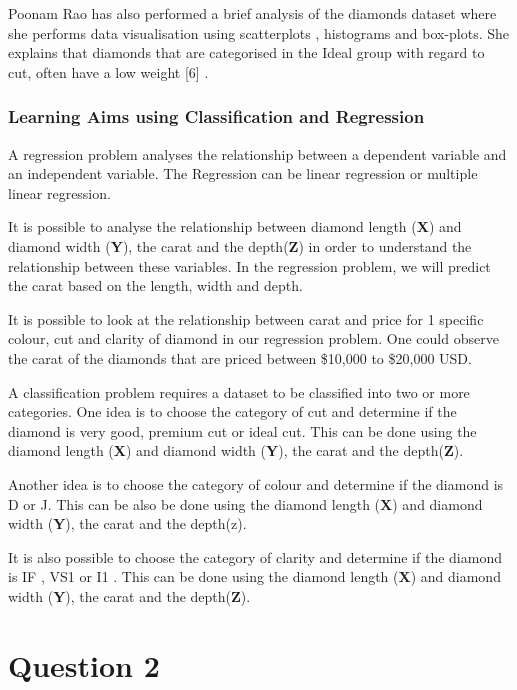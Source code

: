 \documentclass[
]{article}
\begin{document}
Poonam Rao has also performed a brief analysis of the diamonds dataset
where she performs data visualisation using scatterplots , histograms
and box-plots. She explains that diamonds that are categorised in the
Ideal group with regard to cut, often have a low weight {[}6{]} .

\subsubsection{Learning Aims using Classification and
Regression}\label{learning-aims-using-classification-and-regression}

A regression problem analyses the relationship between a dependent
variable and an independent variable. The Regression can be linear
regression or multiple linear regression.

It is possible to analyse the relationship between diamond length
(\textbf{X}) and diamond width (\textbf{Y}), the carat and the
depth(\textbf{Z}) in order to understand the relationship between these
variables. In the regression problem, we will predict the carat based on
the length, width and depth.

It is possible to look at the relationship between carat and price for 1
specific colour, cut and clarity of diamond in our regression problem.
One could observe the carat of the diamonds that are priced between
\$10,000 to \$20,000 USD.

A classification problem requires a dataset to be classified into two or
more categories. One idea is to choose the category of cut and determine
if the diamond is very good, premium cut or ideal cut. This can be done
using the diamond length (\textbf{X}) and diamond width (\textbf{Y}),
the carat and the depth(\textbf{Z}).

Another idea is to choose the category of colour and determine if the
diamond is D or J. This can be also be done using the diamond length
(\textbf{X}) and diamond width (\textbf{Y}), the carat and the depth(z).

It is also possible to choose the category of clarity and determine if
the diamond is IF , VS1 or I1 . This can be done using the diamond
length (\textbf{X}) and diamond width (\textbf{Y}), the carat and the
depth(\textbf{Z}).

\section{Question 2}\label{question-2}
\end{document}
